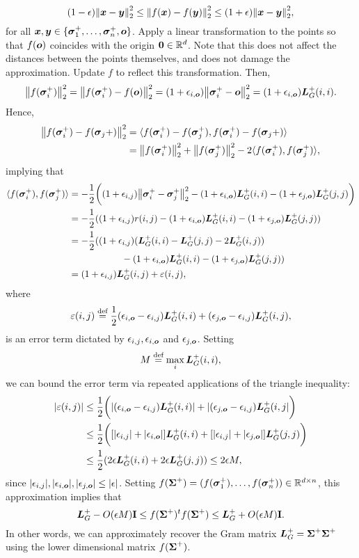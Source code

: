\[(1-\epsilon)\norm{\vb*{x}-\vb*{y}}_2^2\leq  \norm{f(\vb*{x}) -f(\vb*{y})}_2^2\leq (1+\epsilon)\norm{\vb*{x}-\vb*{y}}_2^2, \]
for all $\vb*{x},\vb*{y}\in \{\vb*{\sigma}_1^+,\dots,\vb*{\sigma}_n^+,\vb*{o}\}$. 
Apply a linear transformation to the points so that $f(\vb*{o})$ coincides with the origin $\vb{0}\in\mathbb{R}^d$. Note that this does not affect the distances between the points themselves, and does not damage the approximation. Update $f$ to reflect this transformation. Then, 
\[\norm{f(\vb*{\sigma}_i^+)}_2^2 = \norm{f(\vb*{\sigma}_i^+)-f(\vb*{o})}_2^2 = (1+\epsilon_{i,\vb*{o}})\norm{\vb*{\sigma}_i^+-\vb*{o}}_2^2 = (1+\epsilon_{i,\vb*{o}})\vb*{L}_G^+(i,i).\]
Hence, 
\begin{align*}
    \norm{f(\vb*{\sigma}_i^+)-f(\vb*{\sigma}_j+)}_2^2 &= \langle f(\vb*{\sigma}_i^+)-f(\vb*{\sigma}_j^+),f(\vb*{\sigma}_i^+)-f(\vb*{\sigma}_j+)\rangle \\
    &= \norm{f(\vb*{\sigma}_i^+)}_2^2 + \norm{f(\vb*{\sigma}_j^+)}_2^2 - 2\langle f(\vb*{\sigma}_i^+),f(\vb*{\sigma}_j^+)\rangle,  
\end{align*}
implying that 
\begin{align*}
    \langle f(\vb*{\sigma}_i^+),f(\vb*{\sigma}_j^+) \rangle &= -\frac{1}{2} \bigg((1+\epsilon_{i,j})\norm{\vb*{\sigma}_i^+-\vb*{\sigma}_j^+}_2^2 - (1+\epsilon_{i,\vb*{o}})\vb*{L}_G^+(i,i) - (1+\epsilon_{j,\vb*{o}})\vb*{L}_G^+(j,j)\bigg) \\
    &= -\frac{1}{2}((1+\epsilon_{i,j})r(i,j) - (1+\epsilon_{i,\vb*{o}})\vb*{L}_G^+(i,i) - (1+\epsilon_{j,\vb*{o}})\vb*{L}_G^+(j,j)) \\
    &= -\frac{1}{2}((1+\epsilon_{i,j})(\vb*{L}_G^+(i,i) - \vb*{L}_G^+(j,j) - 2\vb*{L}_G^+(i,j)) \\
    &\hspace{2cm}- (1+\epsilon_{i,\vb*{o}})\vb*{L}_G^+(i,i) - (1+\epsilon_{j,\vb*{o}})\vb*{L}_G^+(j,j))\\
    &= (1+\epsilon_{i,j})\vb*{L}_G^+(i,j) + \varepsilon(i,j),
\end{align*}
where 
\[\varepsilon(i,j)\overset{\text{def}}{=} \frac{1}{2}(\epsilon_{i,\vb*{o}}-\epsilon_{i,j})\vb*{L}_G^+(i,i) + (\epsilon_{j,\vb*{o}}-\epsilon_{i,j})\vb*{L}_G^+(i,j),\]
is an error term dictated by $\epsilon_{i,j}, \epsilon_{i,\vb*{o}}$ and $\epsilon_{j,\vb*{o}}$. Setting 
\[M\overset{\text{def}}{=} \max_i \vb*{L}_G^+(i,i),\]
we can bound the error term via repeated applications of the triangle inequality: 
\begin{align*}
    |\varepsilon(i,j)|& \leq \frac{1}{2}\bigg(|(\epsilon_{i,\vb*{o}}-\epsilon_{i,j})\vb*{L}_G^+(i,i)| + |(\epsilon_{j,\vb*{o}}-\epsilon_{i,j})\vb*{L}_G^+(i,j|\bigg) \\
    & \leq \frac{1}{2}\bigg([|\epsilon_{i,j}|+|\epsilon_{i,\vb*{o}}|]\vb*{L}_G^+(i,i) + [|\epsilon_{i,j}|+|\epsilon_{j,\vb*{o}}|]\vb*{L}_G^+(j,j)\bigg) \\
    &\leq \frac{1}{2} ( 2\epsilon\vb*{L}_G^+(i,i) + 2\epsilon\vb*{L}_G^+(j,j) ) \leq 2\epsilon M,
\end{align*}
since $|\epsilon_{i,j}|, |\epsilon_{i,\vb*{o}}|,|\epsilon_{j,\vb*{o}}|\leq |\epsilon|$. Setting $f(\boldsymbol{\Sigma}^+) = (f(\vb*{\sigma}_1^+),\dots,f(\vb*{\sigma}_n^+))\in \mathbb{R}^{d\times n}$, this approximation implies that 
\begin{equation*}
    \vb*{L}_G^+ - O(\epsilon M)\vb{I} \leq f(\boldsymbol{\Sigma}^+)^t f(\boldsymbol{\Sigma}^+) \leq \vb*{L}_G^+ + O(\epsilon M)\vb{I}. 
\end{equation*}
In other words, we can approximately recover the Gram matrix $\vb*{L}_G^+=\boldsymbol{\Sigma}^+\boldsymbol{\Sigma}^+$ using the lower dimensional matrix $f(\boldsymbol{\Sigma}^+)$. 

